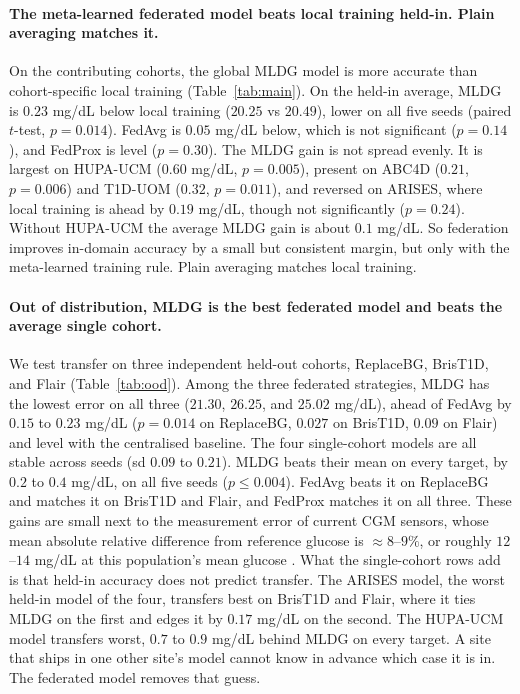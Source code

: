 \documentclass[10pt,letterpaper]{article}
\begin{document}
\paragraph{The meta-learned federated model beats local training held-in.
Plain averaging matches it.} On the contributing cohorts, the global MLDG
model is more accurate than cohort-specific local training
(Table~\ref{tab:main}). On the held-in average, MLDG is $0.23$ mg/dL below
local training ($20.25$ vs $20.49$), lower on all five seeds (paired
$t$-test, $p = 0.014$). FedAvg is $0.05$ mg/dL below, which is not
significant ($p = 0.14$), and FedProx is level ($p = 0.30$). The MLDG gain is
not spread evenly. It is largest on HUPA-UCM ($0.60$ mg/dL, $p = 0.005$),
present on ABC4D ($0.21$, $p = 0.006$) and T1D-UOM ($0.32$, $p = 0.011$),
and reversed on ARISES, where local training is ahead by $0.19$ mg/dL,
though not significantly ($p = 0.24$). Without HUPA-UCM the average MLDG gain
is about $0.1$ mg/dL. So federation improves in-domain accuracy by a small
but consistent margin, but only with the meta-learned training rule. Plain
averaging matches local training.

\paragraph{Out of distribution, MLDG is the best federated model and beats
the average single cohort.} We test transfer on three
independent held-out cohorts, ReplaceBG, BrisT1D, and Flair
(Table~\ref{tab:ood}). Among the three federated strategies, MLDG has the
lowest error on all three ($21.30$, $26.25$, and $25.02$ mg/dL), ahead of
FedAvg by $0.15$ to $0.23$ mg/dL ($p = 0.014$ on ReplaceBG, $0.027$ on
BrisT1D, $0.09$ on Flair) and level with the centralised baseline. The four
single-cohort models are all stable across seeds (sd $0.09$ to $0.21$). MLDG
beats their mean on every target, by $0.2$ to $0.4$ mg/dL, on all five seeds
($p \le 0.004$). FedAvg beats it on ReplaceBG and matches it on BrisT1D and
Flair, and FedProx matches it on all three. These gains are small next to the measurement error of current CGM
sensors, whose mean absolute relative difference from reference glucose is
$\approx 8$--$9\%$, or roughly $12$--$14$ mg/dL at this population's mean
glucose \cite{garg2022dexcomg7,alva2023libre3}. What the single-cohort rows
add is that held-in accuracy does not predict transfer. The ARISES model, the
worst held-in model of the four, transfers best on BrisT1D and Flair, where it
ties MLDG on the first and edges it by $0.17$ mg/dL on the second. The
HUPA-UCM model transfers worst, $0.7$ to $0.9$ mg/dL behind MLDG on every
target. A
site that ships in one other site's model cannot know in advance which case
it is in. The federated model removes that guess.
\end{document}
